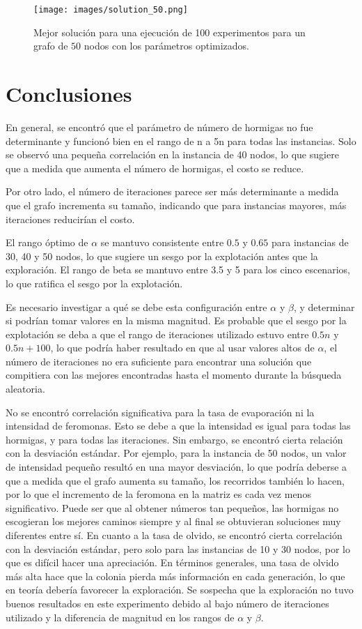 \documentclass[conference]{IEEEtran}
\begin{document}
\begin{figure}[htbp]
  \centering
  \texttt{[image: images/solution\_50.png]}
  \caption{Mejor solución para una ejecución de 100 experimentos para un grafo de $50$ nodos con los parámetros optimizados.}
  \label{fig:image20}
\end{figure}

\section{Conclusiones}

En general, se encontró que el parámetro de número de hormigas no fue determinante y funcionó bien en el rango de n a 5n para todas las instancias. Solo se observó una pequeña correlación en la instancia de 40 nodos, lo que sugiere que a medida que aumenta el número de hormigas, el costo se reduce.

Por otro lado, el número de iteraciones parece ser más determinante a medida que el grafo incrementa su tamaño, indicando que para instancias mayores, más iteraciones reducirían el costo.

El rango óptimo de $\alpha$ se mantuvo consistente entre $0.5$ y $0.65$ para instancias de 30, 40 y 50 nodos, lo que sugiere un sesgo por la explotación antes que la exploración. El rango de beta se mantuvo entre 3.5 y 5 para los cinco escenarios, lo que ratifica el sesgo por la explotación.

Es necesario investigar a qué se debe esta configuración entre $\alpha$ y $\beta$, y determinar si podrían tomar valores en la misma magnitud. Es probable que el sesgo por la explotación se deba a que el rango de iteraciones utilizado estuvo entre $0.5n$ y $0.5n + 100$, lo que podría haber resultado en que al usar valores altos de $\alpha$, el número de iteraciones no era suficiente para encontrar una solución que compitiera con las mejores encontradas hasta el momento durante la búsqueda aleatoria.

No se encontró correlación significativa para la tasa de evaporación ni la intensidad de feromonas. Esto se debe a que la intensidad es igual para todas las hormigas, y para todas las iteraciones. Sin embargo, se encontró cierta relación con la desviación estándar. Por ejemplo, para la instancia de 50 nodos, un valor de intensidad pequeño resultó en una mayor desviación, lo que podría deberse a que a medida que el grafo aumenta su tamaño, los recorridos también lo hacen, por lo que el incremento de la feromona en la matriz es cada vez menos significativo. Puede ser que al obtener números tan pequeños, las hormigas no escogieran los mejores caminos siempre y al final se obtuvieran soluciones muy diferentes entre sí. En cuanto a la tasa de olvido, se encontró cierta correlación con la desviación estándar, pero solo para las instancias de 10 y 30 nodos, por lo que es difícil hacer una apreciación. En términos generales, una tasa de olvido más alta hace que la colonia pierda más información en cada generación, lo que en teoría debería favorecer la exploración. Se sospecha que la exploración no tuvo buenos resultados en este experimento debido al bajo número de iteraciones utilizado y la diferencia de magnitud en los rangos de $\alpha$ y $\beta$.
\end{document}
